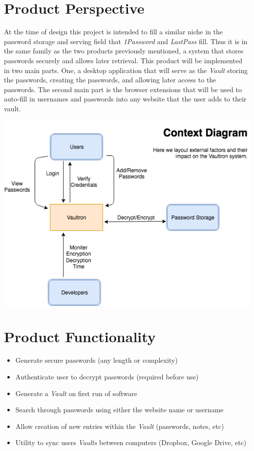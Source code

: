 \documentclass[11pt]{report}
\newenvironment{myitemize}
{ \begin{itemize}
    \setlength{\itemsep}{0pt}
    \setlength{\parskip}{0pt}
    \setlength{\parsep}{0pt}     }
{ \end{itemize}                  }
\begin{document}
\section{Product Perspective}
At the time of design this project is intended to fill a similar
niche in the password storage and serving field that \textit{1Password}
and \textit{LastPass} fill. Thus it is in the same family as
the two products previously mentioned, a system that stores passwords
securely and allows later retrieval. This product will be implemented in
two main parts. One, a desktop application that will serve as the \textit{Vault}
storing the passwords, creating the passwords, and allowing later access
to the passwords. The second main part is the browser extensions that
will be used to auto-fill in usernames and passwords into any website
that the user adds to their vault. 

\includegraphics[scale=0.75]{context-diagram}


\section{Product Functionality}

\begin{myitemize}
    \item Generate secure passwords (any length or complexity)
    \item Authenticate user to decrypt passwords (required before use)
    \item Generate a \textit{Vault} on first run of software
    \item Search through passwords using either the website name or username
    \item Allow creation of new entries within the \textit{Vault} (passwords, notes, etc)
    \item Utility to sync users \textit{Vaults} between computers (Dropbox, Google Drive, etc)
\end{myitemize}
\end{document}
